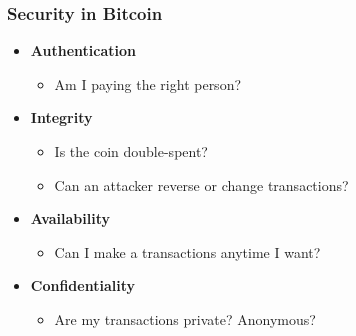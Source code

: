 \begin{frame}
    \frametitle{Security in Bitcoin}
    \begin{itemize}
        \item \textbf{Authentication}
            \begin{itemize}
                \item Am I paying the right person?
            \end{itemize}
        \item \textbf{Integrity}
            \begin{itemize}
                \item Is the coin double-spent?
                \item Can an attacker reverse or change transactions?
            \end{itemize}
        \item \textbf{Availability}
            \begin{itemize}
                \item Can I make a transactions anytime I want?
            \end{itemize}
        \item \textbf{Confidentiality}
            \begin{itemize}
                \item Are my transactions private? Anonymous?
            \end{itemize}
    \end{itemize}
\end{frame}

